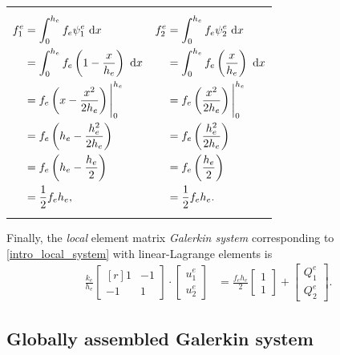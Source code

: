 \begin{table}[H]
\centering
\begin{tabularx}{\linewidth}{XX}
{\begin{align*}
  f_1^e &= \int_0^{h_e} f_e \psi_1^e \ \mathrm{d}x \\
        &= \int_0^{h_e} f_e \left( 1 - \frac{x}{h_e} \right) \ \mathrm{d}x \\
        &= f_e \left( x - \frac{x^2}{2h_e} \right) \Bigg|_0^{h_e} \\
        &= f_e \left( h_e - \frac{h_e^2}{2h_e} \right) \\
        &= f_e \left( h_e - \frac{h_e}{2} \right) \\
        &= \frac{1}{2} f_e h_e,
\end{align*}}
&
{\begin{align*}
  f_2^e &= \int_0^{h_e} f_e \psi_2^e \ \mathrm{d}x \\
        &= \int_0^{h_e} f_e \left( \frac{x}{h_e} \right) \ \mathrm{d}x \\
        &= f_e \left( \frac{x^2}{2h_e} \right) \Bigg|_0^{h_e} \\
        &= f_e \left( \frac{h_e^2}{2h_e} \right) \\
        &= f_e \left( \frac{h_e}{2} \right) \\
        &= \frac{1}{2} f_e h_e.
\end{align*}}
\end{tabularx}
\end{table}

Finally, the  \emph{local} element matrix \emph{Galerkin system} corresponding to \cref{intro_local_system} with linear-Lagrange elements is
\begin{align*}
 \frac{k_e}{h_e}
 \begin{bmatrix}[r]
   1 & -1 \\
   -1 & 1 
 \end{bmatrix} \cdot 
 \begin{bmatrix}
   u_1^e \\ u_2^e
 \end{bmatrix} &= 
 \frac{f_e h_e}{2}
 \begin{bmatrix}
   1 \\ 1
 \end{bmatrix} + 
 \begin{bmatrix}
   Q_1^e \\ Q_2^e
 \end{bmatrix}.
\end{align*}

\subsection{Globally assembled Galerkin system} \label{ssn_global_galerkin_assembly}

